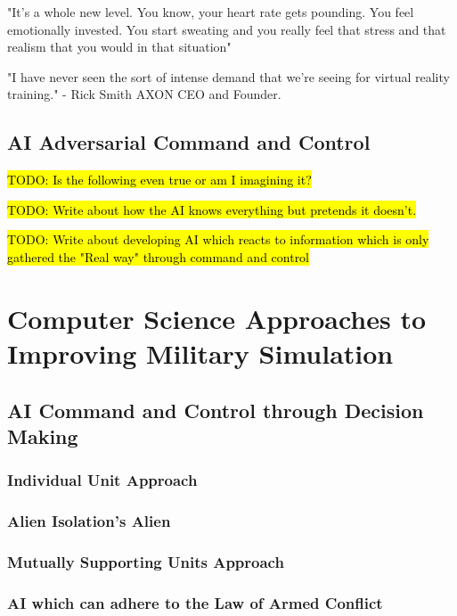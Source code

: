 \documentclass{article}
\begin{document}
"It's a whole new level. You know, your heart rate gets pounding. You feel emotionally invested. You start sweating and you really feel that stress and that realism that you would in that situation"

"I have never seen the sort of intense demand that we're seeing for virtual reality training." - Rick Smith AXON CEO and Founder.


\subsection{AI Adversarial Command and Control}

\hl{TODO: Is the following even true or am I imagining it?}

\hl{TODO: Write about how the AI knows everything but pretends it doesn't.}

\hl{TODO: Write about developing AI which reacts to information which is only gathered the "Real way" through command and control}

\section{Computer Science Approaches to Improving Military Simulation}

\subsection{AI Command and Control through Decision Making}

\subsubsection{Individual Unit Approach}

\subsubsection{Alien Isolation's Alien}

\subsubsection{Mutually Supporting Units Approach}

\subsubsection{AI which can adhere to the Law of Armed Conflict}
\end{document}
